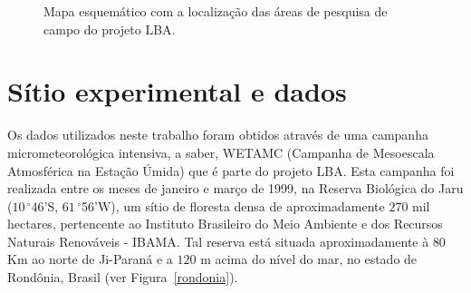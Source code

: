\begin{figure}[ht]
	\caption{Mapa esquemático com a localização das áreas de pesquisa de campo do projeto LBA.}
	\vspace{6mm}	%
	\begin{center}
	\end{center}
	\vspace{4mm}	%
	\label{mapalocal}
\end{figure}

\section{Sítio experimental e dados}
 
Os dados utilizados neste trabalho foram obtidos através de uma campanha micrometeorológica intensiva, a saber, WETAMC (Campanha de Mesoescala Atmosférica na Estação Úmida) que é parte do projeto LBA. Esta campanha foi realizada entre os meses de janeiro e março de 1999, na Reserva Biológica do Jaru ($10\,^{\circ}$46'S, $61\,^{\circ}$56'W), um sítio de floresta densa de aproximadamente $270$ mil hectares, pertencente ao Instituto Brasileiro do Meio Ambiente e dos Recursos Naturais Renováveis - IBAMA. Tal reserva está situada aproximadamente à $80$ Km ao norte de Ji-Paraná e a $120$ m acima do nível do mar, no estado de Rondônia, Brasil (ver Figura~\ref{rondonia}).  

